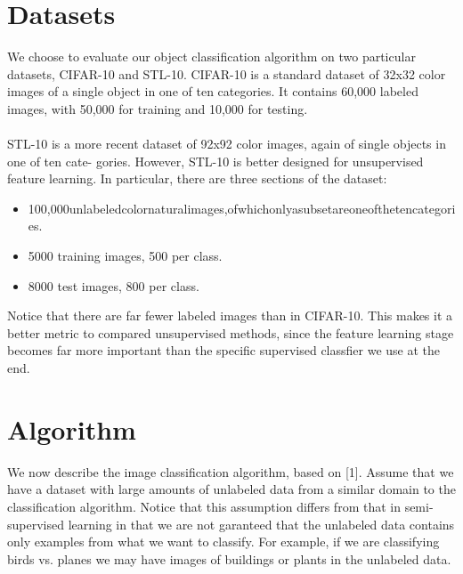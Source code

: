 \documentclass{article} %
\begin{document}
\section{Datasets}
We choose to evaluate our object classification algorithm on two particular datasets, CIFAR-10 and STL-10. CIFAR-10 is a standard dataset of 32x32 color images of a single object in one of ten categories. It contains 60,000 labeled images, with 50,000 for training and 10,000 for testing. \\
\\
STL-10 is a more recent dataset of 92x92 color images, again of single objects in one of ten cate- gories. However, STL-10 is better designed for unsupervised feature learning. In particular, there are three sections of the dataset: \\

\begin{itemize}
  \item 100,000unlabeledcolornaturalimages,ofwhichonlyasubsetareoneofthetencategories.
  \item 5000 training images, 500 per class.
  \item 8000 test images, 800 per class.
\end{itemize}

Notice that there are far fewer labeled images than in CIFAR-10. This makes it a better metric to compared unsupervised methods, since the feature learning stage becomes far more important than the specific supervised classfier we use at the end.

\section{Algorithm}
We now describe the image classification algorithm, based on [1]. Assume that we have a dataset with large amounts of unlabeled data from a similar domain to the classification algorithm. Notice that this assumption differs from that in semi-supervised learning in that we are not garanteed that the unlabeled data contains only examples from what we want to classify. For example, if we are classifying birds vs. planes we may have images of buildings or plants in the unlabeled data.
\end{document}
